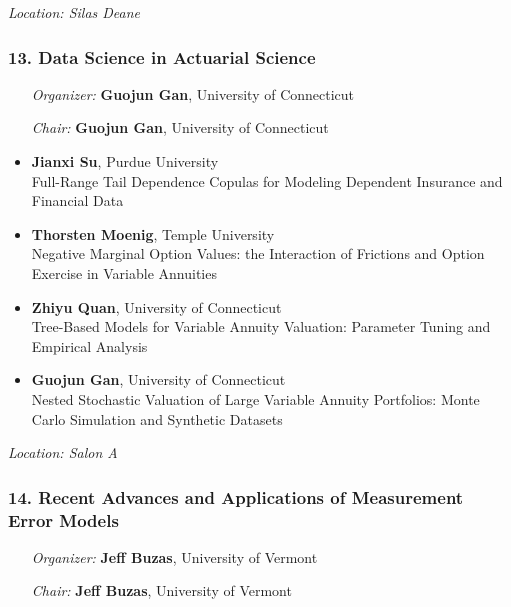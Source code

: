 \emph{Location: Silas Deane}

\subsubsection*{13. Data Science in Actuarial Science}

\begin{enumerate}[align=left]
\item [\emph{Organizer:}] \textbf{Guojun Gan}, University of Connecticut
\item [\emph{Chair:}] \textbf{Guojun Gan}, University of Connecticut
\end{enumerate}

\begin{itemize}
\item \textbf{Jianxi Su}, Purdue University \\
Full-Range Tail Dependence Copulas for Modeling Dependent Insurance and Financial Data
\item \textbf{Thorsten Moenig}, Temple University \\
Negative Marginal Option Values:  the Interaction of Frictions and Option Exercise in Variable Annuities
\item \textbf{Zhiyu Quan}, University of Connecticut \\
Tree-Based Models for Variable Annuity Valuation: Parameter Tuning and Empirical Analysis
\item \textbf{Guojun Gan}, University of Connecticut \\
Nested Stochastic Valuation of Large Variable Annuity Portfolios: Monte Carlo Simulation and Synthetic Datasets
\end{itemize}

\emph{Location: Salon A}

\subsubsection*{14. Recent Advances and Applications of Measurement Error Models}

\begin{enumerate}[align=left]
\item [\emph{Organizer:}] \textbf{Jeff Buzas}, University of Vermont
\item [\emph{Chair:}] \textbf{Jeff Buzas}, University of Vermont
\end{enumerate}

